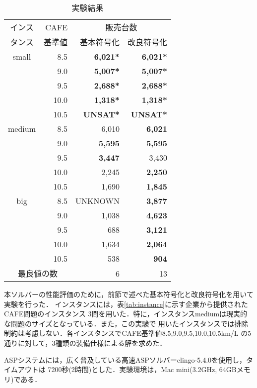 \begin{table}[tb]
 \caption{実験結果}
 \centering
 \begin{tabular}{c|r|rr} \bhline
  インス & CAFE & \multicolumn{2}{c}{販売台数} \\ \cline{3-4}
  タンス & 基準値                & 基本符号化 & 改良符号化 \\\hline    
  small & 8.5   & \textbf{6,021*}       & \textbf{6,021*}       \\
   & 9.0   & \textbf{5,007*}       & \textbf{5,007*}       \\
   & 9.5   & \textbf{2,688*}       & \textbf{2,688*}       \\
   & 10.0  & \textbf{1,318*}       & \textbf{1,318*}       \\
   & 10.5  & \textbf{UNSAT*}       & \textbf{UNSAT*}       \\ \hline
  medium & 8.5  & 6,010        & \textbf{6,021}        \\
   & 9.0  & \textbf{5,595}        & \textbf{5,595}        \\
   & 9.5  & \textbf{3,447}        & 3,430        \\
   & 10.0 & 2,245        & \textbf{2,250}        \\
   & 10.5 & 1,690        & \textbf{1,845}        \\ \hline
  big & 8.5     & UNKNOWN     & \textbf{3,877}        \\
   & 9.0     & 1,038        & \textbf{4,623}        \\
   & 9.5     & 688         & \textbf{3,121}        \\
   & 10.0    & 1,634        & \textbf{2,064}        \\
   & 10.5    & 538         & \textbf{904}         \\ \hline \hline
  \multicolumn{2}{c}{最良値の数} & 6 & 13         \\ \hline
 \end{tabular}
 \label{tab:result}
\end{table}
本ソルバーの性能評価のために，前節で述べた基本符号化と改良符号化を用いて実験を行った．
インスタンスには，表\ref{tab:instance}に示す企業から提供されたCAFE問題のインスタンス
3問を用いた．特に，インスタンスmediumは現実的な問題のサイズとなっている．また，この実験で
用いたインスタンスでは排除制約は考慮しない．各インスタンスでCAFE基準値8.5,9.0,9.5,10.0,10.5km/L
の5通りに対して，3種類の装備仕様による解を求めた．

ASPシステムには，広く普及している高速ASPソルバーclingo-5.4.0を使用し，タイムアウトは
7200秒(2時間)とした．実験環境は，Mac mini(3.2GHz, 64GBメモリ)である．

